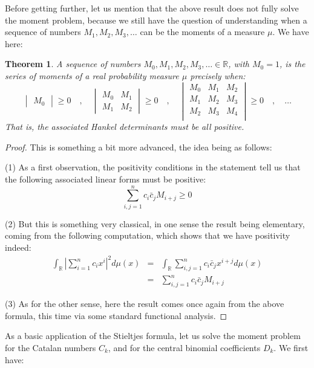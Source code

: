 \documentclass[12pt]{amsbook}
\newtheorem{theorem}{Theorem}[chapter]
\begin{document}
Before getting further, let us mention that the above result does not fully solve the moment problem, because we still have the question of understanding when a sequence of numbers $M_1,M_2,M_3,\ldots$ can be the moments of a measure $\mu$.  We have here:


\begin{theorem}
A sequence of numbers $M_0,M_1,M_2,M_3,\ldots\in\mathbb R$, with $M_0=1$, is the series of moments of a real probability measure $\mu$ precisely when:
$$\begin{vmatrix}M_0\end{vmatrix}\geq0\quad,\quad 
\begin{vmatrix}
M_0&M_1\\
M_1&M_2
\end{vmatrix}\geq0\quad,\quad 
\begin{vmatrix}
M_0&M_1&M_2\\
M_1&M_2&M_3\\
M_2&M_3&M_4\\
\end{vmatrix}\geq0\quad,\quad 
\ldots$$
That is, the associated Hankel determinants must be all positive.
\end{theorem}

\begin{proof}
This is something a bit more advanced, the idea being as follows:

\medskip

(1) As a first observation, the positivity conditions in the statement tell us that the following associated linear forms must be positive:
$$\sum_{i,j=1}^nc_i\bar{c}_jM_{i+j}\geq0$$

(2) But this is something very classical, in one sense the result being elementary, coming from the following computation, which shows that we have positivity indeed:
\begin{eqnarray*}
\int_\mathbb R\left|\sum_{i=1}^nc_ix^i\right|^2d\mu(x)
&=&\int_\mathbb R\sum_{i,j=1}^nc_i\bar{c}_jx^{i+j}d\mu(x)\\
&=&\sum_{i,j=1}^nc_i\bar{c}_jM_{i+j}
\end{eqnarray*}

(3) As for the other sense, here the result comes once again from the above formula, this time via some standard functional analysis.
\end{proof}

As a basic application of the Stieltjes formula, let us solve the moment problem for the Catalan numbers $C_k$, and for the central binomial coefficients $D_k$. We first have:
\end{document}
